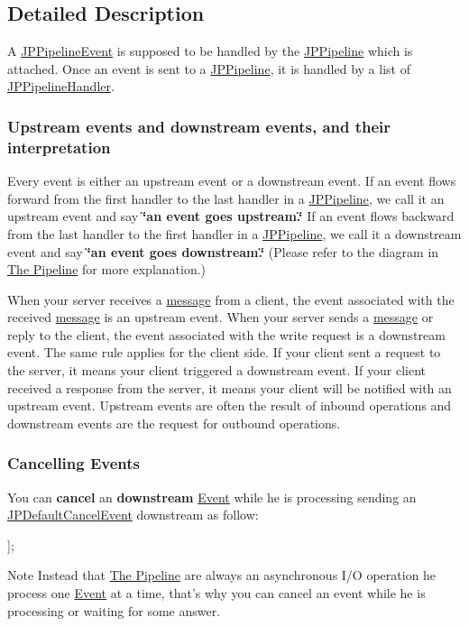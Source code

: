 \subsection{Detailed Description}
A \hyperlink{a00023}{JPPipelineEvent} is supposed to be handled by the \hyperlink{a00019}{JPPipeline} which is attached. Once an event is sent to a \hyperlink{a00019}{JPPipeline}, it is handled by a list of \hyperlink{a00029}{JPPipelineHandler}.

\subsubsection*{Upstream events and downstream events, and their interpretation}

Every event is either an upstream event or a downstream event. If an event flows forward from the first handler to the last handler in a \hyperlink{a00019}{JPPipeline}, we call it an upstream event and say {\bfseries \char`\"{}an
  event goes upstream.\char`\"{}} If an event flows backward from the last handler to the first handler in a \hyperlink{a00019}{JPPipeline}, we call it a downstream event and say {\bfseries \char`\"{}an event goes downstream.\char`\"{}} (Please refer to the diagram in \hyperlink{a00001}{The Pipeline} for more explanation.) 

When your server receives a \hyperlink{a00006}{message} from a client, the event associated with the received \hyperlink{a00006}{message} is an upstream event. When your server sends a \hyperlink{a00006}{message} or reply to the client, the event associated with the write request is a downstream event. The same rule applies for the client side. If your client sent a request to the server, it means your client triggered a downstream event. If your client received a response from the server, it means your client will be notified with an upstream event. Upstream events are often the result of inbound operations and downstream events are the request for outbound operations.

\subsubsection*{Cancelling Events}

You can {\bfseries cancel} an {\bfseries downstream} \hyperlink{a00005}{Event} while he is processing sending an \hyperlink{a00010}{JPDefaultCancelEvent} downstream as follow: 
\begin{DoxyCode}
 [pipeline sendDownstream:[JPDefaultCancelEvent init]];
\end{DoxyCode}
 \begin{DoxyNote}{Note}
Instead that \hyperlink{a00001}{The Pipeline} are always an asynchronous I/O operation he process one \hyperlink{a00005}{Event} at a time, that's why you can cancel an event while he is processing or waiting for some answer. 
\end{DoxyNote}


